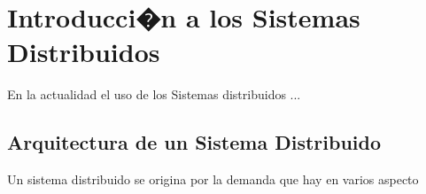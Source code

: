\chapter{Introducci�n a los Sistemas Distribuidos}
\label{ch:capitulo1}

En la actualidad el uso de los Sistemas distribuidos ...






\section{Arquitectura de un Sistema Distribuido}
Un sistema distribuido se origina por la demanda que hay en varios aspecto
